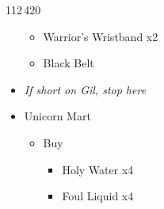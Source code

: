 \begin{shop}{112\,420}
\begin{multicols}{2}
\begin{itemize}
\begin{itemize}
        \item Warrior's Wristband x2
        \item Black Belt
    \end{itemize}
    \item\textit{If short on Gil, stop here}
    \item Unicorn Mart
    \begin{itemize}
        \item Buy
        \begin{itemize}
            \item Holy Water x4
            \item Foul Liquid x4
        \end{itemize}
    \end{itemize}
\end{itemize}
\end{multicols}
\end{shop}
